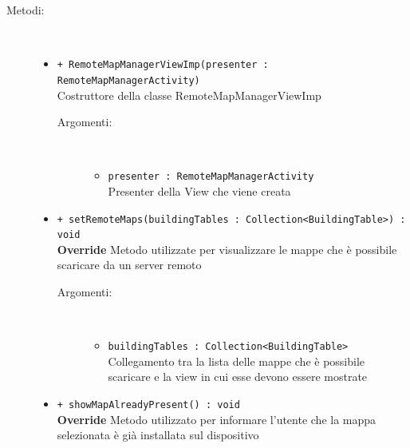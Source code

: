 \documentclass[../DefinizioneDiProdotto.tex]{subfiles}
\begin{document}
\begin{description}
\begin{itemize}
	\end{itemize}
	\item[Metodi:] \
	\begin{itemize}
		\item \texttt{+ RemoteMapManagerViewImp(presenter : RemoteMapManagerActivity)}\\
		Costruttore della classe RemoteMapManagerViewImp
		\begin{description}
			\item[Argomenti:] \
			\begin{itemize}
				\item \texttt{presenter : RemoteMapManagerActivity}\\
				Presenter della View che viene creata\end{itemize}
		\end{description}
		\item \texttt{+ setRemoteMaps(buildingTables : Collection<BuildingTable>) : void}\\
		\textbf{Override} Metodo utilizzate per visualizzare le mappe che è possibile scaricare da un server remoto
		\begin{description}
			\item[Argomenti:] \
			\begin{itemize}
				\item \texttt{buildingTables : Collection<BuildingTable>}\\
				Collegamento tra la lista delle mappe che è possibile scaricare e la view in cui esse devono essere mostrate\end{itemize}
		\end{description}
		\item \texttt{+ showMapAlreadyPresent() : void}\\
		\textbf{Override} Metodo utilizzato per informare l'utente che la mappa selezionata è già installata sul dispositivo
	\end{itemize}
\end{description}
\end{document}
